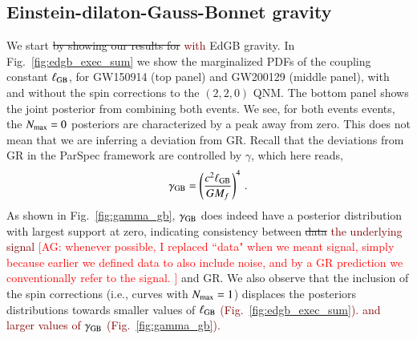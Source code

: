 \documentclass[twocolumn,
               prd,
               aps,
               superscriptaddress,
               tightenlines,
               nofootinbib,
               eqsecnum,
               amsfonts,
               amsmath,
               longbibliography]{revtex4-1}
\newcommand{\agcomm}[1]{{\textcolor{red}{{[AG: #1]}} }}
\newcommand{\ag}[1]{{\textcolor{Maroon}{{#1}} }}
\newcommand{\hs}[1]{{\textcolor{blue}{{[HS: #1]}} }}
\begin{document}



\subsection{Einstein-dilaton-Gauss-Bonnet gravity}
\label{sec:results_edgb}

We start \sout{by showing our results for} \ag{with} EdGB gravity.
%
In Fig.~\ref{fig:edgb_exec_sum} we show the marginalized PDFs of the
coupling constant $\ell_{\rm GB}$, for GW150914 (top panel) and GW200129
(middle panel), with and without the spin corrections to the $(2,2,0)$ QNM.
%
The bottom panel shows the joint posterior from combining both events.
%
We see, for both events events, the $N_{\rm max} = 0$ posteriors are
characterized by a peak away from zero.
%
This does not mean that we are inferring a deviation from GR.
%
Recall that the deviations from GR in the ParSpec framework are controlled
by $\gamma$, which here reads,
%
\begin{equation}
    \gamma_{\rm GB} = \left(\frac{c^2 \ell_{\rm GB}}{ G M_{f}}\right)^4\,.
    \label{eq:def_gamma_gb}
\end{equation}
%
As shown in Fig.~\ref{fig:gamma_gb}, $\gamma_{\rm GB}$ does indeed have a posterior
distribution with largest support at zero, indicating consistency between \sout{data} 
\ag{the underlying signal} \agcomm{whenever possible, I replaced ``data" when we 
meant signal, simply because earlier we defined data to also include noise, and by a
GR prediction we conventionally refer to the signal. }
and GR.
%
We also observe that the inclusion of the spin corrections (i.e., curves with $N_{\rm max} = 1$)
displaces the posteriors distributions towards smaller values of $\ell_{\rm GB}$ \ag{(Fig.~\ref{fig:edgb_exec_sum}).
and larger values of $\gamma_{\rm GB}$ (Fig.~\ref{fig:gamma_gb}).}
\end{document}

